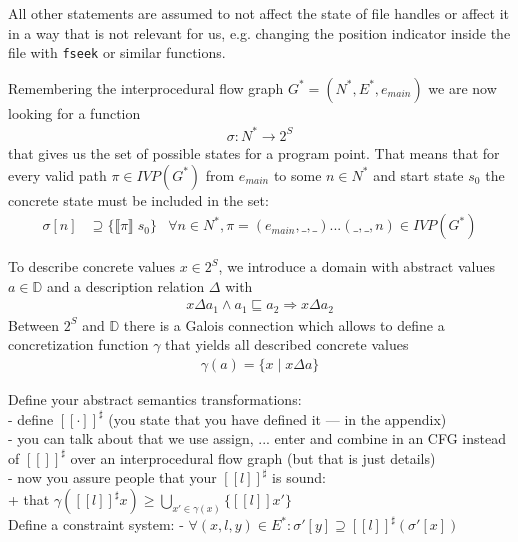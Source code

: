 All other statements are assumed to not affect the state of file handles or affect it in a way that is not relevant for us, e.g. changing the position indicator inside the file with \verb|fseek| or similar functions.

Remembering the interprocedural flow graph $G^* = (N^*, E^*, e_{main})$ we are now looking for a function
\begin{align}
\sigma : N^* \to 2^S
\end{align}
that gives us the set of possible states for a program point.
That means that for every valid path $\pi \in \mathit{IVP}(G^*)$ from $e_{main}$ to some $n \in N^*$ and start state $s_0$ the concrete state must be included in the set:
\begin{align}
\sigma[n] &\supseteq \{ \llbracket \pi \rrbracket \; s_0 \}		&\forall n \in N^*, \pi = (e_{main},\_,\_)...(\_,\_,n) \in \mathit{IVP}(G^*)
\end{align}

To describe concrete values $x \in 2^S$, we introduce a domain with abstract values $a \in \mathbb{D}$ and a description relation $\Delta$ with
\begin{align}
x \Delta a_1 \wedge a_1 \sqsubseteq a_2 \Longrightarrow x \Delta a_2
\end{align}
Between $2^S$ and $\mathbb{D}$ there is a Galois connection which allows to define a concretization function $\gamma$ that yields all described concrete values
\begin{align}
\gamma(a) = \{ x \; | \; x \Delta a \}
\end{align}

Define your abstract semantics transformations:\\
  - define $[[ \cdot ]]^\sharp$  (you state that you have defined it --- in the appendix)\\
  - you can talk about that we use assign, ... enter and combine in an CFG instead of
      $[[ ]]^\sharp$ over an interprocedural flow graph (but that is just details)\\
  - now you assure people that your $[[l]]^\sharp$  is sound:\\
    + that $\gamma([[ l ]]^\sharp x) \geq \bigcup_{x' \in \gamma(x)} \{ [[ l ]] x' \}$\\

Define a constraint system:
  - $\forall (x,l,y)\in E^* : \sigma'[y] \supseteq [[l]]^\sharp (\sigma'[x])$\\


